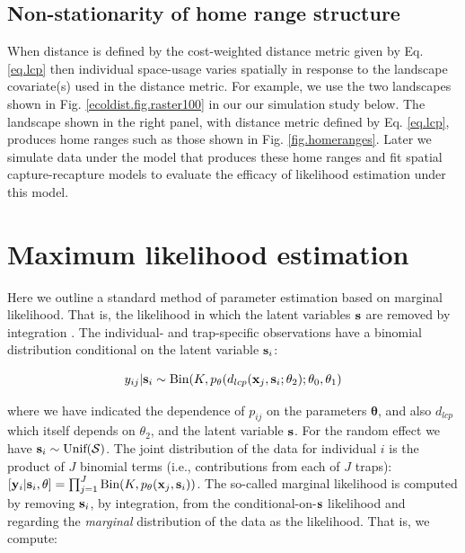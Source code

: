 \documentclass[12pt]{article}
\begin{document}
\begin{spacing}{1.8}
\subsection{Non-stationarity of home range structure}

When distance is defined by the cost-weighted distance metric given
by Eq. \ref{eq.lcp} then individual space-usage varies
spatially in response to the landscape covariate(s) used in the
distance metric. For example, we use the two landscapes shown in
Fig. \ref{ecoldist.fig.raster100}
in our
our simulation study below. The landscape shown in the right panel, with
distance
metric defined by Eq. \ref{eq.lcp}, produces home ranges such
as those shown in Fig. \ref{fig.homeranges}. Later we simulate data
under the model that produces these home ranges and fit spatial
capture-recapture models to evaluate the efficacy of likelihood
estimation under this model.




\section{Maximum likelihood estimation}
\label{sec.mle}

Here we outline a standard method of parameter estimation based on
marginal likelihood. That is, the likelihood in which the latent
variables ${\bf s}$ are removed by integration \citep{borchers_efford:2008}.
The individual- and trap-specific observations have a binomial
distribution conditional on the latent variable ${\bf s}_{i}$:

\begin{equation}
	y_{ij}| {\bf s}_{i} \sim \mbox{Bin}(K, p_{\theta}(d_{lcp}({\bf x}_{j},{\bf s}_{i};\theta_{2}); \theta_{0}, \theta_{1})
\label{mle.eq.cond-on-s}
\end{equation}

{\flushleft where} we have indicated the dependence of $p_{ij}$ on the parameters
${\bm \theta}$, and also $d_{lcp}$ which
itself depends on $\theta_{2}$, and the latent variable ${\bf s}$.
For the random effect we have ${\bf s}_{i} \sim  \mbox{Unif}({\cal
  S})$.
The joint distribution of the data for individual $i$ is the product
of $J$ binomial terms (i.e., contributions from each of $J$ traps):
$  [{\bf y}_{i} | {\bf s}_{i} , \theta] =
  \prod_{j=1}^{J} \mbox{Bin}(K, p_{\theta}({\bf x}_{j},{\bf s}_{i}) )$.
 The so-called marginal likelihood is computed by removing
${\bf s}_{i}$, by integration,  from the conditional-on-${\bf s}$
likelihood and regarding the {\it marginal} distribution of the data
as the likelihood. That
is, we compute:


\end{spacing}
\end{document}
